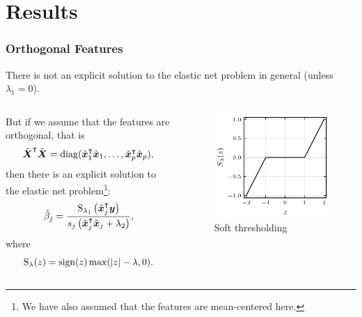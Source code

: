 \documentclass[10pt]{beamer}
\begin{document}
\section{Results}

\begin{frame}[c]
  \frametitle{Orthogonal Features}

  There is not an explicit solution to the elastic net problem in general (unless \(\lambda_1
  = 0\)).

  \bigskip\pause

  \begin{columns}
    \begin{column}{0.45\textwidth}
      But if we assume that the features are orthogonal, that is
      \[
        \tilde{\boldsymbol{X}}^\intercal \tilde{\boldsymbol{X}} = \operatorname{diag}(\tilde{\boldsymbol{x}}_1^\intercal \tilde{\boldsymbol{x}}_1, \dots, \tilde{\boldsymbol{x}}_p^\intercal \tilde{\boldsymbol{x}}_p),
      \]
      then there is an explicit solution to the elastic net problem\footnote[frame]{We have also
        assumed that the features are mean-centered here.}:
      \begin{equation*}
        \hat\beta_j = \frac{\operatorname{S}_{\lambda_1}\left(\tilde{\boldsymbol{x}}_j^\intercal \boldsymbol{y}\right)}{s_j\left(\tilde{\boldsymbol{x}}_j^\intercal \tilde{\boldsymbol{x}}_j + \lambda_2\right)},
      \end{equation*}
      where
      \[
        \operatorname{S}_\lambda(z) = \operatorname{sign}(z) \max(|z| - \lambda, 0).
      \]\pause
    \end{column}
    \begin{column}{0.45\textwidth}
      \begin{figure}[htpb]
        \centering
        \includegraphics[]{figures/soft-thresholding.pdf}
        \caption{%
          Soft thresholding
        }
      \end{figure}
    \end{column}
  \end{columns}

\end{frame}
\end{document}
